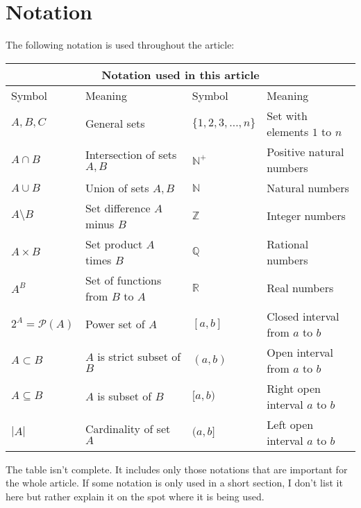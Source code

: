 \documentclass[12pt]{article}
\begin{document}
\section{Notation}
The following notation is used throughout the article:
\begin{center}
\begin{tabular}{ |p{2cm}|p{6cm}||p{3cm}|p{5cm}|  }
\hline
\multicolumn{4}{|c|}{Notation used in this article} \\
\hline
Symbol & Meaning & Symbol & Meaning  \\
\hline
$A,B,C$                & General sets                     & $\{1,2,3, \ldots, n\}$ & Set with elements $1$ to $n$ \\
$A \cap B$             & Intersection of sets $A,B$       & $\mathbb{N}^+$         & Positive natural numbers \\
$A \cup B$             & Union of sets $A,B$              & $\mathbb{N}$           & Natural numbers        \\
$A \setminus B$        & Set difference $A$ minus $B$     & $\mathbb{Z}$           & Integer numbers  \\
$A \times B$           & Set product $A$ times $B$        & $\mathbb{Q}$           & Rational numbers  \\
$A^B$                  & Set of functions from $B$ to $A$ & $\mathbb{R}$           & Real numbers  \\
$2^A = \mathcal{P}(A)$ & Power set of $A$                 & $[a,b]$                & Closed interval from $a$ to $b$\\
$A \subset B$          & $A$ is strict subset of $B$      & $(a,b)$                & Open interval from $a$ to $b$\\
$A \subseteq B$        & $A$ is subset of $B$             & $[a,b)$                & Right open interval $a$ to $b$\\
$|A|$                  & Cardinality of set $A$           & $(a,b]$                & Left open interval $a$ to $b$\\
\hline
\end{tabular}
\end{center}
The table isn't complete. It includes only those notations that are important for the whole article. If some notation is only used in a short section, I don't list it here but rather explain it on the spot where it is being used.
\end{document}
